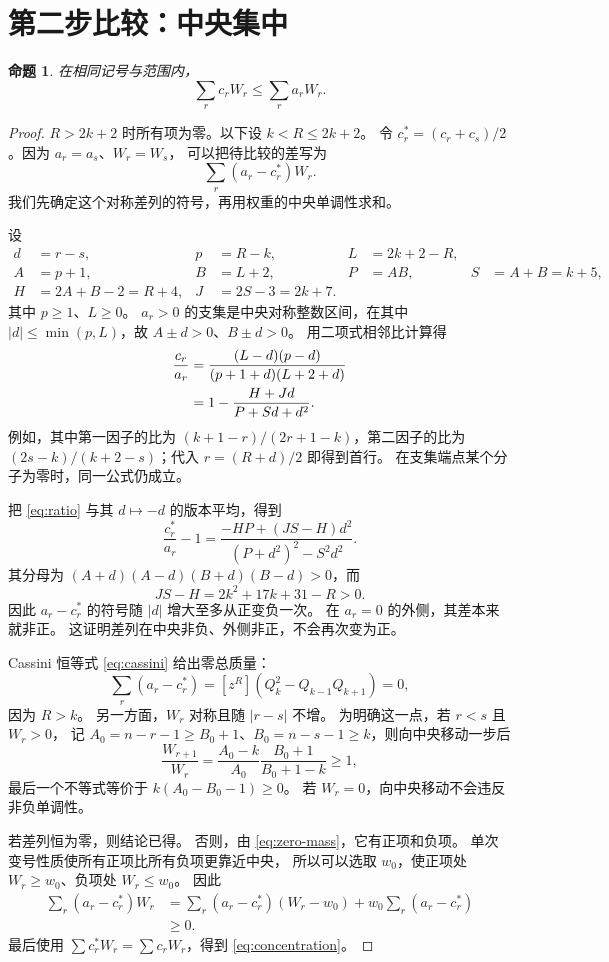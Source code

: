 \documentclass[UTF8,a4paper,11pt,fontset=none]{ctexart}
\numberwithin{equation}{section}
\theoremstyle{paperplain}
\newtheorem{proposition}[theorem]{命题}
\theoremstyle{definition}
\theoremstyle{remark}
\begin{document}
\section{第二步比较：中央集中}\label{sec:concentration}
\begin{proposition}\label{prop:concentration}
在相同记号与范围内，
\begin{equation}\label{eq:concentration}
\sum_r c_rW_r\le\sum_r a_rW_r.
\end{equation}
\end{proposition}
\begin{proof}
$R>2k+2$ 时所有项为零。以下设 $k<R\le2k+2$。
令 $c_r^*=(c_r+c_s)/2$。因为 $a_r=a_s$、$W_r=W_s$，
可以把待比较的差写为
\[
\sum_r(a_r-c_r^*)W_r.
\]
我们先确定这个对称差列的符号，再用权重的中央单调性求和。

设
\begin{align*}
d&=r-s,&p&=R-k,&L&=2k+2-R,\\
A&=p+1,&B&=L+2,&P&=AB,&S&=A+B=k+5,\\
H&=2A+B-2=R+4,&J&=2S-3=2k+7.
\end{align*}
其中 $p\ge1$、$L\ge0$。
$a_r>0$ 的支集是中央对称整数区间，在其中
$|d|\le\min(p,L)$，故 $A\pm d>0$、$B\pm d>0$。
用二项式相邻比计算得
\begin{align}
\frac{c_r}{a_r}
&=\frac{(L-d)(p-d)}{(p+1+d)(L+2+d)}\notag\\
&=1-\frac{H+Jd}{P+Sd+d^2}.\label{eq:ratio}
\end{align}
例如，其中第一因子的比为
$(k+1-r)/(2r+1-k)$，第二因子的比为
$(2s-k)/(k+2-s)$；代入 $r=(R+d)/2$ 即得到首行。
在支集端点某个分子为零时，同一公式仍成立。

把 \eqref{eq:ratio} 与其 $d\mapsto-d$ 的版本平均，得到
\begin{equation}\label{eq:single-cross}
\frac{c_r^*}{a_r}-1
=\frac{-HP+(JS-H)d^2}{(P+d^2)^2-S^2d^2}.
\end{equation}
其分母为
$(A+d)(A-d)(B+d)(B-d)>0$，而
\[
JS-H=2k^2+17k+31-R>0.
\]
因此 $a_r-c_r^*$ 的符号随 $|d|$ 增大至多从正变负一次。
在 $a_r=0$ 的外侧，其差本来就非正。
这证明差列在中央非负、外侧非正，不会再次变为正。

Cassini 恒等式 \eqref{eq:cassini} 给出零总质量：
\begin{equation}\label{eq:zero-mass}
\sum_r(a_r-c_r^*)
=[z^R](Q_k^2-Q_{k-1}Q_{k+1})=0,
\end{equation}
因为 $R>k$。
另一方面，$W_r$ 对称且随 $|r-s|$ 不增。
为明确这一点，若 $r<s$ 且 $W_r>0$，
记 $A_0=n-r-1\ge B_0+1$、$B_0=n-s-1\ge k$，则向中央移动一步后
\[
\frac{W_{r+1}}{W_r}
=\frac{A_0-k}{A_0}\frac{B_0+1}{B_0+1-k}\ge1,
\]
最后一个不等式等价于 $k(A_0-B_0-1)\ge0$。
若 $W_r=0$，向中央移动不会违反非负单调性。

若差列恒为零，则结论已得。
否则，由 \eqref{eq:zero-mass}，它有正项和负项。
单次变号性质使所有正项比所有负项更靠近中央，
所以可以选取 $w_0$，使正项处 $W_r\ge w_0$、负项处 $W_r\le w_0$。
因此
\begin{align*}
\sum_r(a_r-c_r^*)W_r
&=\sum_r(a_r-c_r^*)(W_r-w_0)
+w_0\sum_r(a_r-c_r^*)\\
&\ge0.
\end{align*}
最后使用 $\sum c_r^*W_r=\sum c_rW_r$，得到 \eqref{eq:concentration}。
\end{proof}
\end{document}
